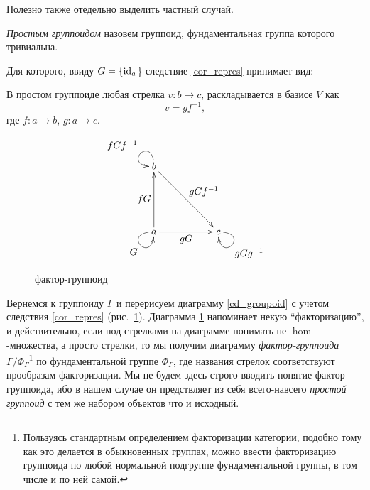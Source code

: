     Полезно также отедельно выделить частный случай.

    \begin{definition}
        \emph{Простым группоидом} назовем группоид, фундаментальная группа 
        которого тривиальна.
    \end{definition}

    Для которого, ввиду $G = \{\operatorname*{id}_a$\} следствие \ref{cor_repres} принимает вид:

    \begin{corollary}\label{cor_simple_grp}
        В простом группоиде любая стрелка $v : b \to c$, раскладывается в 
        базисе $V$ как
        \[v = gf^{-1},\]
        где $f : a \to b$, $g : a \to c$.
    \end{corollary}
    
    \begin{figure}[h]
        \centering
        \[\xymatrix{
            b \ar@(u,l)[]_{\textstyle fGf^{-1}} \ar[ddrr]^{\textstyle gGf^{-1}}             & &                             \\
                                                                                            & &                             \\
            a \ar@(l,d)[]_{\textstyle G} \ar[uu]^{\textstyle fG} \ar[rr]_{\textstyle gG}    & & c \ar@(r,d)[]^{\textstyle gGg^{-1}}
        }\]
        \caption{фактор-группоид}
        \label{cd_groupoid_repres}
    \end{figure}

    Вернемся к группоиду $\Gamma$ и перерисуем диаграмму \ref{cd_groupoid} с 
    учетом следствия \ref{cor_repres} (рис.~\ref{cd_groupoid_repres}). 
    Диаграмма \ref{cd_groupoid_repres} напоминает некую ``факторизацию'', и 
    действительно, если под стрелками на диаграмме понимать не $\hom$-множества,
    а просто стрелки, то мы получим диаграмму \emph{фактор-группоида} 
    $\Gamma/\Phi_\Gamma$\footnote{Пользуясь стандартным 
    определением факторизации категории\cite{MacLane}, подобно тому как это 
    делается в обыкновенных группах, можно ввести 
    факторизацию группоида по любой нормальной подгруппе фундаментальной 
    группы, в том числе и по ней самой.} по фундаментальной группе $\Phi_\Gamma$, 
    где названия стрелок соответствуют прообразам 
    факторизации. Мы не будем здесь строго вводить понятие фактор-группоида, 
    ибо в нашем случае он предствляет из себя всего-навсего \emph{простой 
    группоид} с тем же набором объектов что и исходный.

